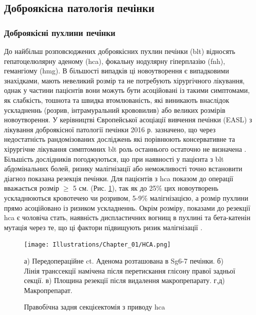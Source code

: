 \subsection{Доброякісна патологія печінки}

\subsubsection{Доброякісні пухлини печінки}

До найбільш розповсюджених доброякісних пухлин печінки (\acrshort{blt}) відносять гепатоцелюлярну аденому (\acrshort{hca}), фокальну нодулярну гіперплазію (\acrshort{fnh}), гемангіому (\acrshort{hmg}). В більшості випадків ці новоутворення є випадковими знахідками, мають невеликий розмір та не потребують хірургічного лікування, однак у частини пацієнтів вони можуть бути асоційовані із такими симптомами, як слабкість, тошнота та швидка втомлюваність, які виникають внаслідок ускладненнь (розрив, інтрамуральний крововилив) або великих розмірів новоутворення. У керівництві Європейської асоціації вивчення печінки (EASL) з лікування доброякісної патології печінки 2016 р. зазначено, що через недостатність рандомізованих досліджень які порівнюють консервативне та хірургічне лікування симптомних \acrshort{blt} роль останнього остаточно не визначена \cite{Colombo2016}. Більшість дослідників погоджуються, що при наявності у пацієнта з \acrshort{blt} абдомінальних болей, ризику малігнізації або неможливості точно встановити діагноз показана резекція печінки. Для пацієнтів з \acrshort{hca} показом до операції вважається розмір $\geq$ 5 см. (Рис. \ref{fig:HCA}), так як до 25\% цих новоутворень ускладнюються кровотечею чи розривом, 5-9\% малігнізацією, а розмір пухлини прямо асоційовано із ризиком ускладненнь. Окрім розміру, показами до резекції \acrshort{hca} є чоловіча стать, наявність диспластичних вогнищ в пухлині та  бета-катенін мутація через те, що ці фактори підвищують ризик малігнізації \cite{Ercolani2015}.


\begin{figure}[!ht]
\caption{Правобічна задня секцієектомія з приводу \acrshort{hca}}

\texttt{[image: Illustrations/Chapter\_01/HCA.png]}
\label{fig:HCA}

\medskip
\small
а) Передопераційне \acrshort{ct}. Аденома розташована в Sg6-7 печінки. б) Лінія транссекції намічена після перетискання глісону правої задньої секції. в) Площина резекції після видалення макропрепарату. г,д) Макропрепарат.

\end{figure}


